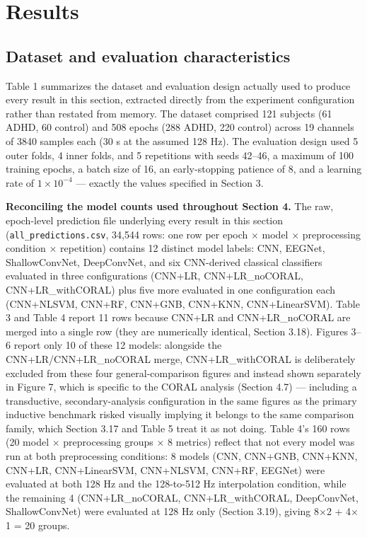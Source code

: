 \documentclass[a4paper,fleqn]{cas-sc}
\begin{document}
\section{Results}

\subsection{Dataset and evaluation characteristics}

Table 1 summarizes the dataset and evaluation design actually used to produce every result in this section, extracted directly from the experiment configuration rather than restated from memory. The dataset comprised 121 subjects (61 ADHD, 60 control) and 508 epochs (288 ADHD, 220 control) across 19 channels of 3840 samples each (30 s at the assumed 128 Hz). The evaluation design used 5 outer folds, 4 inner folds, and 5 repetitions with seeds 42--46, a maximum of 100 training epochs, a batch size of 16, an early-stopping patience of 8, and a learning rate of $1\times10^{-4}$ --- exactly the values specified in Section 3.



\textbf{Reconciling the model counts used throughout Section 4.} The raw, epoch-level prediction file underlying every result in this section (\texttt{all\_predictions.csv}, 34,544 rows: one row per epoch $\times$ model $\times$ preprocessing condition $\times$ repetition) contains 12 distinct model labels: CNN, EEGNet, ShallowConvNet, DeepConvNet, and six CNN-derived classical classifiers evaluated in three configurations (CNN+LR, CNN+LR\_noCORAL, CNN+LR\_withCORAL) plus five more evaluated in one configuration each (CNN+NLSVM, CNN+RF, CNN+GNB, CNN+KNN, CNN+LinearSVM). Table 3 and Table 4 report 11 rows because CNN+LR and CNN+LR\_noCORAL are merged into a single row (they are numerically identical, Section 3.18). Figures 3--6 report only 10 of these 12 models: alongside the CNN+LR/CNN+LR\_noCORAL merge, CNN+LR\_withCORAL is deliberately excluded from these four general-comparison figures and instead shown separately in Figure 7, which is specific to the CORAL analysis (Section 4.7) --- including a transductive, secondary-analysis configuration in the same figures as the primary inductive benchmark risked visually implying it belongs to the same comparison family, which Section 3.17 and Table 5 treat it as not doing. Table 4's 160 rows (20 model $\times$ preprocessing groups $\times$ 8 metrics) reflect that not every model was run at both preprocessing conditions: 8 models (CNN, CNN+GNB, CNN+KNN, CNN+LR, CNN+LinearSVM, CNN+NLSVM, CNN+RF, EEGNet) were evaluated at both 128 Hz and the 128-to-512 Hz interpolation condition, while the remaining 4 (CNN+LR\_noCORAL, CNN+LR\_withCORAL, DeepConvNet, ShallowConvNet) were evaluated at 128 Hz only (Section 3.19), giving 8$\times$2 + 4$\times$1 = 20 groups.
\end{document}
